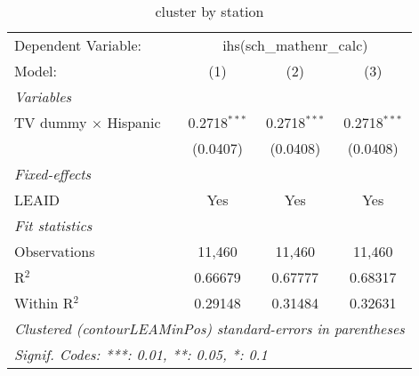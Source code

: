 \begin{table}[htbp]
\centering
\caption{cluster by station}
\begin{tabular}{lccc}
\tabularnewline\midrule\midrule
Dependent Variable:&\multicolumn{3}{c}{ihs(sch\_mathenr\_calc)}\\
Model:&(1) & (2) & (3)\\
\midrule \emph{Variables}&   &   &  \\
TV dummy $\times$ Hispanic & 0.2718$^{***}$ & 0.2718$^{***}$ & 0.2718$^{***}$\\
  &(0.0407) & (0.0408) & (0.0408)\\
\midrule \emph{Fixed-effects}&   &   &  \\
LEAID & Yes & Yes & Yes\\
\midrule \emph{Fit statistics}&  & & \\
Observations & 11,460&11,460&11,460\\
R$^2$ & 0.66679&0.67777&0.68317\\
Within R$^2$ & 0.29148&0.31484&0.32631\\
\midrule\midrule\multicolumn{4}{l}{\emph{Clustered (contourLEAMinPos) standard-errors in parentheses}}\\
\multicolumn{4}{l}{\emph{Signif. Codes: ***: 0.01, **: 0.05, *: 0.1}}\\
\end{tabular}
\end{table}

